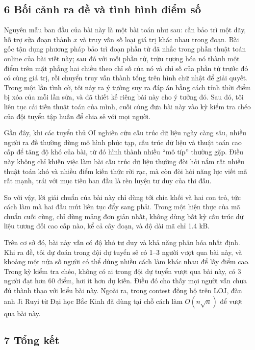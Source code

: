\documentclass[11pt]{article}
\begin{document}
\subsection*{6 Bối cảnh ra đề và tình hình điểm số}

Nguyên mẫu ban đầu của bài này là một bài toán như sau: cần bảo trì một dãy, hỗ
trợ sửa đoạn thành \(x\) và truy vấn số loại giá trị khác nhau trong đoạn. Bài
gốc tận dụng phương pháp bảo trì đoạn phần tử đã nhắc trong phần thuật toán
online của bài viết này; sau đó với mỗi phần tử, trừu tượng hóa nó thành một
điểm trên mặt phẳng hai chiều theo chỉ số của nó và chỉ số của phần tử trước đó
có cùng giá trị, rồi chuyển truy vấn thành tổng trên hình chữ nhật để giải
quyết. Trong một lần tình cờ, tôi nảy ra ý tưởng suy ra đáp án bằng cách tính
thời điểm bị xóa của mỗi lần sửa, và đã thiết kế riêng bài này cho ý tưởng đó.
Sau đó, tôi liên tục cải tiến thuật toán của mình, cuối cùng đưa bài này vào kỳ
kiểm tra chéo của đội tuyển tập huấn để chia sẻ với mọi người.

Gần đây, khi các tuyển thủ OI nghiên cứu cấu trúc dữ liệu ngày càng sâu, nhiều
người ra đề thường dùng mô hình phức tạp, cấu trúc dữ liệu và thuật toán cao cấp
để tăng độ khó của bài, từ đó hình thành nhiều ``mô típ'' thường gặp. Điều này
không chỉ khiến việc làm bài cấu trúc dữ liệu thường đòi hỏi nắm rất nhiều thuật
toán khó và nhiều điểm kiến thức rời rạc, mà còn đòi hỏi năng lực viết mã rất
mạnh, trái với mục tiêu ban đầu là rèn luyện tư duy của thi đấu.

So với vậy, lời giải chuẩn của bài này chỉ dùng tới chia khối và hai con trỏ,
tức cách làm mà hai đầu mút liên tục đẩy sang phải. Trong một hiện thực của mã
chuẩn cuối cùng, chỉ dùng mảng đơn giản nhất, không dùng bất kỳ cấu trúc dữ liệu
tương đối cao cấp nào, kể cả cây đoạn, và độ dài mã chỉ 1.4 kB.

Trên cơ sở đó, bài này vẫn có độ khó tư duy và khả năng phân hóa nhất định. Khi
ra đề, tôi dự đoán trong đội dự tuyển sẽ có 1--3 người vượt qua bài này, và
khoảng một nửa số người có thể dùng nhiều cách làm khác nhau để lấy điểm cao.
Trong kỳ kiểm tra chéo, không có ai trong đội dự tuyển vượt qua bài này, có 3
người đạt hơn 60 điểm, hơi ít hơn dự kiến. Điều đó cho thấy mọi người vẫn chưa
đủ thành thạo với kiểu bài này. Ngoài ra, trong contest đồng bộ trên LOJ, đàn
anh Ji Ruyi từ Đại học Bắc Kinh đã dùng tại chỗ cách làm \(O(n\sqrt n)\) để vượt
qua bài này.

\subsection*{7 Tổng kết}
\end{document}
